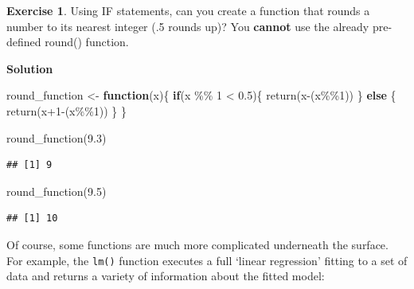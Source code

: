 \documentclass[
]{book}
\newenvironment{Shaded}{\begin{snugshade}}{\end{snugshade}}
\newcommand{\ControlFlowTok}[1]{\textcolor[rgb]{0.13,0.29,0.53}{\textbf{#1}}}
\newcommand{\DecValTok}[1]{\textcolor[rgb]{0.00,0.00,0.81}{#1}}
\newcommand{\FloatTok}[1]{\textcolor[rgb]{0.00,0.00,0.81}{#1}}
\newcommand{\FunctionTok}[1]{\textcolor[rgb]{0.00,0.00,0.00}{#1}}
\newcommand{\NormalTok}[1]{#1}
\newcommand{\OtherTok}[1]{\textcolor[rgb]{0.56,0.35,0.01}{#1}}
\newcommand{\SpecialCharTok}[1]{\textcolor[rgb]{0.00,0.00,0.00}{#1}}
\theoremstyle{definition}
\theoremstyle{definition}
\theoremstyle{definition}
\newtheorem{exercise}{Exercise}[chapter]
\theoremstyle{definition}
\theoremstyle{remark}
\begin{document}
\begin{exercise}
Using IF statements, can you create a function that rounds a number to its nearest integer (.5 rounds up)? You \textbf{cannot} use the already pre-defined round() function.
\end{exercise}

\textbf{Solution}

\begin{Shaded}
\begin{Highlighting}[]
\NormalTok{round\_function }\OtherTok{\textless{}{-}} \ControlFlowTok{function}\NormalTok{(x)\{}
  \ControlFlowTok{if}\NormalTok{(x }\SpecialCharTok{\%\%} \DecValTok{1} \SpecialCharTok{\textless{}} \FloatTok{0.5}\NormalTok{)\{}
    \FunctionTok{return}\NormalTok{(x}\SpecialCharTok{{-}}\NormalTok{(x}\SpecialCharTok{\%\%}\DecValTok{1}\NormalTok{))}
\NormalTok{  \} }\ControlFlowTok{else}\NormalTok{ \{}
    \FunctionTok{return}\NormalTok{(x}\SpecialCharTok{+}\DecValTok{1}\SpecialCharTok{{-}}\NormalTok{(x}\SpecialCharTok{\%\%}\DecValTok{1}\NormalTok{))}
\NormalTok{  \}}
\NormalTok{\}}

\FunctionTok{round\_function}\NormalTok{(}\FloatTok{9.3}\NormalTok{)}
\end{Highlighting}
\end{Shaded}

\begin{verbatim}
## [1] 9
\end{verbatim}

\begin{Shaded}
\begin{Highlighting}[]
\FunctionTok{round\_function}\NormalTok{(}\FloatTok{9.5}\NormalTok{)}
\end{Highlighting}
\end{Shaded}

\begin{verbatim}
## [1] 10
\end{verbatim}

Of course, some functions are much more complicated underneath the surface. For example, the \texttt{lm()} function executes a full `linear regression' fitting to a set of data and returns a variety of information about the fitted model:

\begin{Shaded}
\end{Shaded}
\end{document}
